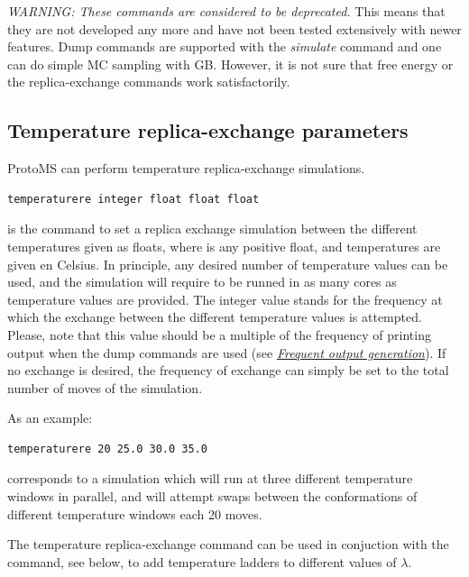 \documentclass[letterpaper,10pt,english]{sphinxmanual}
\begin{document}
\emph{WARNING: These commands are considered to be deprecated.} This means that they are not developed any more and have not been tested extensively with newer features. Dump commands are supported with the \emph{simulate} command and one can do simple MC sampling with GB. However, it is not sure that free energy or the replica-exchange commands work satisfactorily.


\subsection{Temperature replica-exchange parameters}
\label{protoms:temperature-replica-exchange-parameters}
ProtoMS can perform temperature replica-exchange simulations.

\begin{Verbatim}[commandchars=\\\{\}]
temperaturere integer float float float
\end{Verbatim}

is the command to set a replica exchange simulation between the different temperatures given as floats, where  is any positive float, and temperatures are given en Celsius. In principle, any desired number of temperature values can be used, and the simulation will require to be runned in as many cores as temperature values are provided. The integer value stands for the frequency at which the exchange between the different temperature values is attempted. Please, note that this value should be a multiple of the frequency of printing output when the dump commands are used (see {\hyperref[protoms:frequent-output-generation]{\emph{Frequent output generation}}}). If no exchange is desired, the frequency of exchange can simply be set to the total number of moves of the simulation.

As an example:

\begin{Verbatim}[commandchars=\\\{\}]
temperaturere 20 25.0 30.0 35.0
\end{Verbatim}

corresponds to a simulation which will run at three different temperature windows in parallel, and will attempt swaps between the conformations of different temperature windows each 20 moves.

The temperature replica-exchange command can be used in conjuction with the  command, see below, to add temperature ladders to different values of \(\lambda\).
\end{document}
